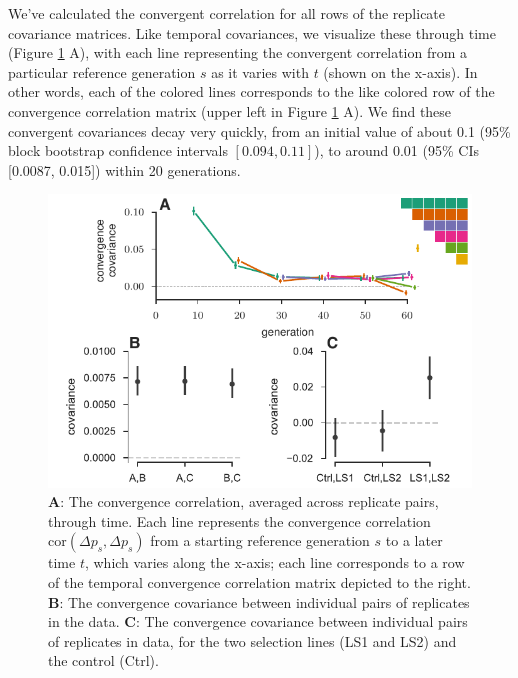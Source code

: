 \documentclass[11pt]{article}
\begin{document}
We've calculated the convergent correlation for all rows of the replicate
covariance matrices. Like temporal covariances, we visualize these through time
(Figure \ref{fig:figure-2} A), with each line representing the convergent
correlation from a particular reference generation $s$ as it varies with $t$
(shown on the x-axis). In other words, each of the colored lines corresponds to
the like colored row of the convergence correlation matrix (upper left in
Figure \ref{fig:figure-2} A). We find these convergent covariances decay very
quickly, from an initial value of about 0.1 (95\% block bootstrap confidence
intervals $[0.094, 0.11]$), to around 0.01 (95\% CIs [0.0087, 0.015]) within 20
generations.

\begin{figure}[!htb]
  \centering
  \includegraphics[width=\textwidth]{figures/figure-2.pdf}

  \caption{{\bf A}: The convergence correlation, averaged across replicate
    pairs, through time. Each line represents the convergence correlation
    $\mathrm{cor}(\Delta p_{s}, \Delta p_{s})$ from a starting reference
    generation $s$ to a later time $t$, which varies along the x-axis; each
    line corresponds to a row of the temporal convergence correlation matrix
    depicted to the right.  {\bf B}: The convergence covariance between
    individual pairs of replicates in the \textcite{Kelly2019-dc} data. {\bf
    C}:  The convergence covariance between individual pairs of replicates in
\parencite{Castro2019-uk} data, for the two selection lines  (LS1 and LS2) and
the control (Ctrl).}

  \label{fig:figure-2}
\end{figure}
\end{document}
